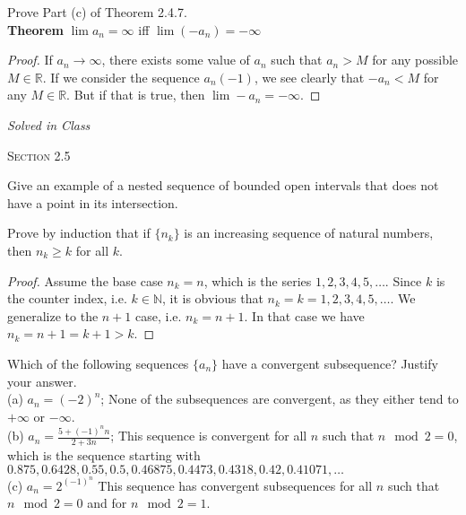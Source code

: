 \documentclass[12pt]{article}
\newcommand{\N}{\mathbb{N}}
\newcommand{\R}{\mathbb{R}}
\newenvironment{exercise}[2][Exercise]{\begin{trivlist}
\item[\hskip \labelsep {\bfseries #1}\hskip \labelsep {\bfseries #2.}]}{\end{trivlist}}
\begin{document}
\begin{exercise}{2.4.11}
Prove Part (c) of Theorem 2.4.7. \\
 	\textbf{Theorem} $\lim a_n = \infty$ iff $\lim(-a_n)= -\infty $
 	
 	\begin{proof}
 	If $a_n \to \infty$, there exists some value of $a_n$ such that $a_n > M$ for any possible $M\in\R$. If we consider the sequence $a_n (-1)$, we see clearly that $-a_n < M$ for any $M\in\R$. But if that is true, then $\lim -a_n= -\infty$.
 	\end{proof}
\end{exercise}

\begin{exercise}{2.4.14}
\emph{Solved in Class}
\end{exercise}



\begin{center}
\textsc{\Large Section 2.5}
\end{center}

\begin{exercise}{2.5.1}
Give an example of a nested sequence of bounded open intervals that does not have a point in its intersection.
\end{exercise}

\begin{exercise}{2.5.4}
Prove by induction that if $\{n_k\}$ is an increasing sequence of natural numbers, then $n_k \geq k$ for all $k$.
	\begin{proof}
	Assume the base case $n_k=n$, which is the series $1,2,3,4,5,\hdots$. Since $k$ is the counter index, i.e. $k \in \N$, it is obvious that $n_k = k = 1,2,3,4,5, \hdots$. We generalize to the $n+1$ case, i.e. $n_k = n+1$. In that case we have $n_k = n+1 = k+1 > k$.
	\end{proof}
\end{exercise}


\begin{exercise}{2.5.5}
Which of the following sequences $\{a_n \}$ have a convergent subsequence? Justify your answer. \\
(a) $a_n= (-2)^n$; None of the subsequences are convergent, as they either tend to $+\infty$ or $-\infty$.\\
(b) $a_n = \frac{5+(-1)^n n}{2+3n}$; This sequence is convergent for all $n$ such that $n\mod 2=0$, which is the sequence starting with $0.875, 0.6428, 0.55, 0.5, 0.46875, 0.4473, 0.4318, 0.42, 0.41071, \hdots$\\
(c) $a_n=2^{(-1)^n}$ This sequence has convergent subsequences for all $n$ such that $n\mod 2=0$ and for $n \mod 2 = 1$.
\end{exercise}
\end{document}
